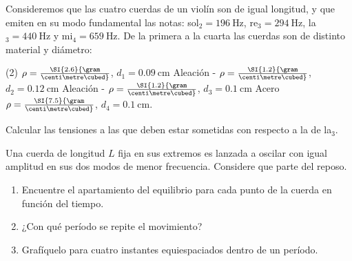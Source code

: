 \item Consideremos que las cuatro cuerdas de un violín son de igual longitud, y que emiten en su modo fundamental las notas: sol$_\text{2}= \SI{196}{\hertz}$, re$_\text{3}= \SI{294}{\hertz}$, la$_\text{3}= \SI{440}{\hertz}$ y mi$_\text{4}= \SI{659}{\hertz}$.
De la primera a la cuarta las cuerdas son de distinto material y diámetro:
\begin{tasks}[style=enumerate](2)
	\task {} \(\rho= \SI{2.6}{\gram\over\centi\metre\cubed}\), \(d_1= \SI{0,09}{\centi\metre}\)
	\task Aleación - $\rho = \SI{1.2}{\gram\over\centi\metre\cubed}$, $d_2 = \SI{0.12}{\centi\metre}$
	\task Aleación - $\rho = \SI{1.2}{\gram\over\centi\metre\cubed}$, $d_3 = \SI{0.1}{\centi\metre}$
	\task Acero $\rho = \SI{7.5}{\gram\over\centi\metre\cubed}$, $d_4 = \SI{0.1}{\centi\metre}$.
\end{tasks}
Calcular las tensiones a las que deben estar sometidas con respecto a la de la$_\text{3}$.


\item Una cuerda de longitud $L$ fija en sus extremos es lanzada a oscilar con igual amplitud en sus dos modos de menor frecuencia.
Considere que parte del reposo. 
\begin{enumerate}
	\item Encuentre el apartamiento del equilibrio para cada punto de la cuerda en función del tiempo.
	\item ¿Con qué período se repite el movimiento?
	\item Grafíquelo para cuatro instantes equiespaciados dentro de un período. 
\end{enumerate}


